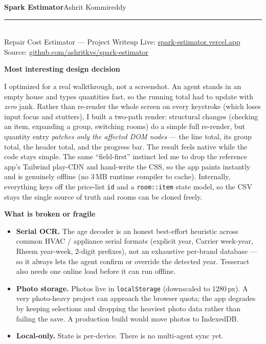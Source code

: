 \documentclass[10pt]{article}
\newcommand{\sechead}[1]{\vspace{3pt}\par{\color{spark}\large\bfseries #1}\par\vspace{1pt}}
\newenvironment{tight}{\begin{itemize}\setlength{\itemsep}{1pt}\setlength{\parskip}{0pt}\setlength{\topsep}{1pt}\setlength{\leftmargin}{1.2em}}{\end{itemize}}
\newcommand{\lead}[1]{\textbf{\color{spark}#1}\;}
\begin{document}
{\LARGE\bfseries Spark Estimator}\hfill{\large Ashrit Kommireddy}\\[1pt]
{\color{spark}\rule{\textwidth}{1.2pt}}\\[2pt]
Repair Cost Estimator --- Project Writeup \hfill
Live: \href{https://spark-estimator.vercel.app/}{spark-estimator.vercel.app}\\
\hspace*{\fill}Source: \href{https://github.com/ashritkvs/spark-estimator}{github.com/ashritkvs/spark-estimator}

\sechead{Most interesting design decision}
I optimized for a real walkthrough, not a screenshot. An agent stands in an empty house and
types quantities fast, so the running total had to update with \emph{zero} jank. Rather than
re-render the whole screen on every keystroke (which loses input focus and stutters), I built a
two-path render: structural changes (checking an item, expanding a group, switching rooms) do a
simple full re-render, but quantity entry \emph{patches only the affected DOM nodes} --- the line
total, its group total, the header total, and the progress bar. The result feels native while the
code stays simple. The same ``field-first'' instinct led me to drop the reference app's Tailwind
play-CDN and hand-write the CSS, so the app paints instantly and is genuinely offline (no 3\,MB
runtime compiler to cache). Internally, everything keys off the price-list \texttt{id} and a
\texttt{room::item} state model, so the CSV stays the single source of truth and rooms can be
cloned freely.

\sechead{What is broken or fragile}
\begin{tight}
  \item \lead{Serial OCR.} The age decoder is an honest best-effort heuristic across common
  HVAC / appliance serial formats (explicit year, Carrier week-year, Rheem year-week, 2-digit
  prefixes), not an exhaustive per-brand database --- so it always lets the agent confirm or
  override the detected year. Tesseract also needs one online load before it can run offline.
  \item \lead{Photo storage.} Photos live in \texttt{localStorage} (downscaled to 1280\,px). A very
  photo-heavy project can approach the browser quota; the app degrades by keeping selections and
  dropping the heaviest photo data rather than failing the save. A production build would move
  photos to IndexedDB.
  \item \lead{Local-only.} State is per-device. There is no multi-agent sync yet.
\end{tight}
\end{document}
